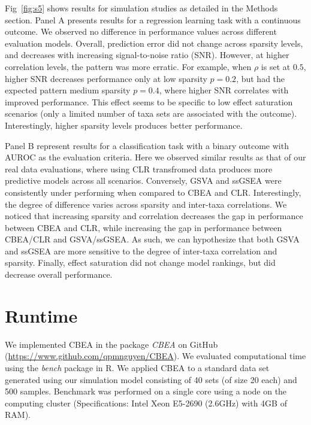 \documentclass{article}
\begin{document}
Fig~\ref{fig:s5} shows results for simulation studies as detailed in the Methods section. Panel A presents results for a regression learning task with a continuous outcome. We observed no difference in performance values across different evaluation models. Overall, prediction error did not change across sparsity levels, and decreases with increasing signal-to-noise ratio (SNR). However, at higher correlation levels, the pattern was more erratic. For example, when $\rho$ is set at $0.5$, higher SNR decreases performance only at low sparsity $p = 0.2$, but had the expected pattern medium sparsity $p = 0.4$, where higher SNR correlates with improved performance. This effect seems to be specific to low effect saturation scenarios (only a limited number of taxa sets are associated with the outcome). Interestingly, higher sparsity levels produces better performance.

Panel B represent results for a classification task with a binary outcome with AUROC as the evaluation criteria. Here we observed similar results as that of our real data evaluations, where using CLR transfromed data produces more predictive models across all scenarios. Conversely, GSVA and ssGSEA were consistently under performing when compared to CBEA and CLR. Interestingly, the degree of difference varies across sparsity and inter-taxa correlations. We noticed that increasing sparsity and correlation decreases the gap in performance between CBEA and CLR, while increasing the gap in performance between CBEA/CLR and GSVA/ssGSEA. As such, we can hypothesize that both GSVA and ssGSEA are more sensitive to the degree of inter-taxa correlation and sparsity. Finally, effect saturation did not change model rankings, but did decrease overall performance.  

\section{Runtime} 
We implemented CBEA in the package \emph{CBEA} on GitHub (\url{https://www.github.com/qpmnguyen/CBEA}). We evaluated computational time using the \emph{bench} package in R. We applied CBEA to a standard data set generated using our simulation model consisting of 40 sets (of size 20 each) and 500 samples. Benchmark was performed on a single core using a node on the computing cluster (Specifications: Intel Xeon E5-2690 (2.6GHz) with 4GB of RAM). 
\end{document}
